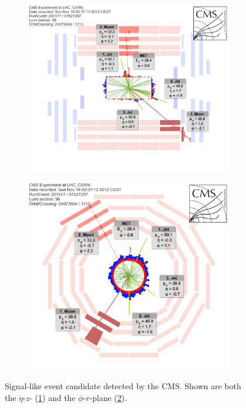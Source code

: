 \begin{figure}[!htbp]
  \centering
  \begin{subfigure}[b]{0.75\textwidth}
    \centering
    \includegraphics[width=\textwidth]{plots/event_display_eta_z.png}
    \caption{\label{fig:evt-eta-z}}
  \end{subfigure}
  \begin{subfigure}[b]{0.75\textwidth}
    \centering
    \includegraphics[width=\textwidth]{plots/event_display_phi_r.png}
    \caption{\label{fig:evt-phi-r}}
  \end{subfigure}
  \caption{Signal-like event candidate detected by the CMS. Shown are both the $\eta$-$z$- (\ref{fig:evt-eta-z}) and the $\phi$-$r$-plane (\ref{fig:evt-phi-r}).}
  \label{fig:evt-display}
\end{figure}


